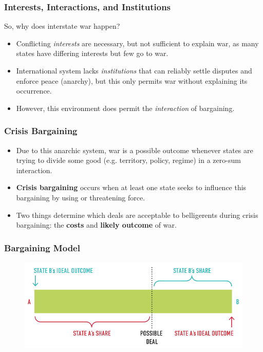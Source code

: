 \documentclass[handout]{beamer}
\begin{document}
\begin{frame} 
\frametitle{\LARGE{Interests, Interactions, and Institutions}}
So, why does interstate war happen?
\begin{itemize}
		\item Conflicting \emph{interests} are necessary, but not sufficient to explain war, as many states have differing interests but few go to war. \pause 
		\item International system lacks \emph{institutions} that can reliably settle disputes and enforce peace (anarchy), but this only permits war without explaining its occurrence. \pause 
		\item However, this environment does permit the \emph{interaction} of bargaining.
\end{itemize}
\end{frame}

\begin{frame} 
\frametitle{\LARGE{Crisis Bargaining}}
	\begin{itemize}
		\item Due to this anarchic system, war is a possible outcome whenever states are trying to divide some good (e.g. territory, policy, regime) in a zero-sum interaction. \pause
		\item \textbf{Crisis bargaining} occurs when at least one state seeks to influence this bargaining by using or threatening force. \pause
		\item Two things determine which deals are acceptable to belligerents during crisis bargaining: the \textbf{costs} and \textbf{likely outcome} of war. 
	\end{itemize}
\end{frame}

\begin{frame} 
\frametitle{\LARGE{Bargaining Model}}
\begin{figure}[ht!]
	\centering
	\includegraphics[width=\textwidth,height=0.8\textheight,keepaspectratio]{./barg1.png}
\end{figure}
\end{frame}
\end{document}

